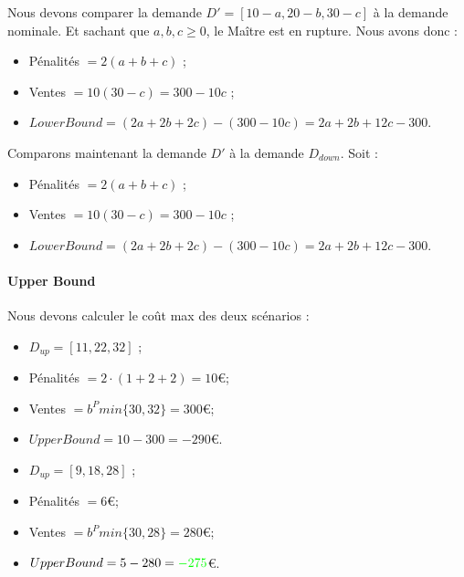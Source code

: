 \documentclass[11pt,a4paper]{article}
\begin{document}
Nous devons comparer la demande $D'=[10-a, 20-b, 30-c]$ à la demande nominale. Et sachant que $a, b, c \geq 0$, le Maître est en rupture. Nous avons donc :

\begin{itemize}
    \item Pénalités $=2(a+b+c)$ ;
    \item Ventes $=10(30-c)=300-10c$ ;
    \item $LowerBound=(2a+2b+2c)-(300-10c)=2a+2b+12c-300$.
\end{itemize}

Comparons maintenant la demande $D'$ à la demande $D_{down}$. Soit :

\begin{itemize}
    \item Pénalités $=2(a+b+c)$ ;
    \item Ventes $=10(30-c)=300-10c$ ;
    \item $LowerBound=(2a+2b+2c)-(300-10c)=2a+2b+12c-300$.
\end{itemize}





\paragraph{Upper Bound} Nous devons calculer le coût max des deux scénarios :

\begin{itemize}
Scénario 1 : Attaque $D_{up}$ (rupture)
    \item $D_{up}=[11, 22, 32]$ ;
    \item Pénalités $=2\cdot(1+2+2)=10$\euro ;
    \item Ventes $=b^Pmin\{30, 32\}=300$\euro ;
    \item $UpperBound=10-300=-290$\euro.
\end{itemize}

\begin{itemize}
Scénario 2 : Attaque $D_{down}$ (sur-stock)
    \item $D_{up}=[9, 18, 28]$ ;
    \item Pénalités $=6$\euro ;
    \item Ventes $=b^Pmin\{30, 28\}=280$\euro ;
    \item $UpperBound=5-280=\textcolor{green}{-275}$\euro.
\end{itemize}
\end{document}
